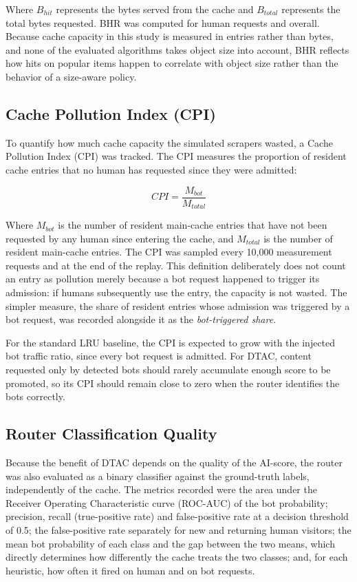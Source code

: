 Where $B_{hit}$ represents the bytes served from the cache and $B_{total}$ represents the total bytes requested. BHR was computed for human requests and overall. Because cache capacity in this study is measured in entries rather than bytes, and none of the evaluated algorithms takes object size into account, BHR reflects how hits on popular items happen to correlate with object size rather than the behavior of a size-aware policy.

\subsection{Cache Pollution Index (CPI)}
To quantify how much cache capacity the simulated scrapers wasted, a Cache Pollution Index (CPI) was tracked. The CPI measures the proportion of resident cache entries that no human has requested since they were admitted:

\begin{equation}
CPI = \frac{M_{bot}}{M_{total}}
\end{equation}

Where $M_{bot}$ is the number of resident main-cache entries that have not been requested by any human since entering the cache, and $M_{total}$ is the number of resident main-cache entries. The CPI was sampled every 10,000 measurement requests and at the end of the replay. This definition deliberately does not count an entry as pollution merely because a bot request happened to trigger its admission: if humans subsequently use the entry, the capacity is not wasted. The simpler measure, the share of resident entries whose admission was triggered by a bot request, was recorded alongside it as the \emph{bot-triggered share}.

For the standard LRU baseline, the CPI is expected to grow with the injected bot traffic ratio, since every bot request is admitted. For DTAC, content requested only by detected bots should rarely accumulate enough score to be promoted, so its CPI should remain close to zero when the router identifies the bots correctly.

\subsection{Router Classification Quality}
Because the benefit of DTAC depends on the quality of the AI-score, the router was also evaluated as a binary classifier against the ground-truth labels, independently of the cache. The metrics recorded were the area under the Receiver Operating Characteristic curve (ROC-AUC) of the bot probability; precision, recall (true-positive rate) and false-positive rate at a decision threshold of 0.5; the false-positive rate separately for new and returning human visitors; the mean bot probability of each class and the gap between the two means, which directly determines how differently the cache treats the two classes; and, for each heuristic, how often it fired on human and on bot requests.


